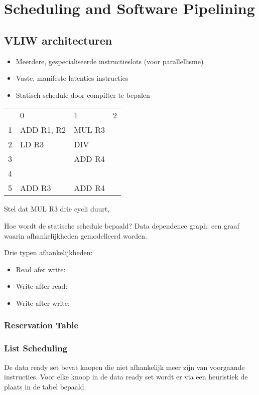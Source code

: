 \chapter{Scheduling and Software Pipelining}


\section{VLIW architecturen}
\begin{itemize}
	\item Meerdere, gespecialiseerde instructieslots (voor parallellisme)
	\item Vaste, manifeste latenties instructies
	\item Statisch schedule door compilter te bepalen
\end{itemize}

\begin{table}
	\begin{tabular}{l | l | l | l}
		& 0 & 1 & 2 \\
		1 & ADD R1, R2 & MUL R3 & \\
		2 & LD R3 & DIV & \\
		3 & & ADD R4 &  \\
		4 & & & \\
		5 & ADD R3 & ADD R4 & \\
	\end{tabular}
\end{table}

Stel dat MUL R3 drie cycli duurt, 


Hoe wordt de statische schedule bepaald? Data dependence graph: een graaf waarin afhankelijkheden gemodelleerd worden.

Drie typen afhankelijkheden:
\begin{itemize}
	\item Read afer write:
	\item Write after read: 
	\item Write after write: 
\end{itemize}

\subsection{Reservation Table}



\subsection{List Scheduling}
De data ready set bevat knopen die niet afhankelijk meer zijn van voorgaande instructies. Voor elke knoop in de data ready set wordt er via een heuristiek de plaats in de tabel bepaald.

